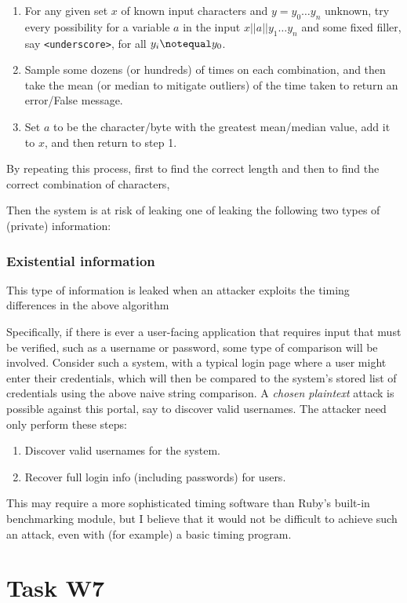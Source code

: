 \documentclass{article}
\providecommand{\tightlist}{
    \setlength{\itemsep}{0pt}\setlength{\parskip}{0pt}
}
\providecommand{\inlinecode}{\texttt}
\begin{document}
\begin{enumerate}\tightlist
  \item For any given set $x$ of known input characters and $y = {y_0 \dots y_n}$ unknown, try every possibility for a variable $a$ in the input $x || a || y_1 \dots y_n$ and some fixed filler, say \inlinecode{<underscore>}, for all $y_i \notequal y_0$.
  \item Sample some dozens (or hundreds) of times on each combination, and then take the mean (or median to mitigate outliers) of the time taken to return an error/False message.
  \item Set $a$ to be the character/byte with the greatest mean/median value, add it to $x$, and then return to step 1.
\end{enumerate}
By repeating this process, first to find the correct length and then to find the correct combination of characters,

Then the system is at risk of leaking one of leaking the following two types of (private) information:
\subsubsection{Existential information}
This type of information is leaked when an attacker exploits the timing differences in the above algorithm



Specifically, if there is ever a user-facing application that requires input that must be verified, such as a username or password, some type of comparison will be involved. Consider such a system, with a typical login page where a user might enter their credentials, which will then be compared to the system's stored list of credentials using the above naive string comparison. A \textit{chosen plaintext} attack is possible against this portal, say to discover valid usernames. The attacker need only perform these steps:
\begin{enumerate}\tightlist
  \item Discover valid usernames for the system.
  \item Recover full login info (including passwords) for users.
\end{enumerate}

This may require a more sophisticated timing software than Ruby's built-in benchmarking module, but I believe that it would not be difficult to achieve such an attack, even with (for example) a basic timing program.

\section{Task W7}
\end{document}
